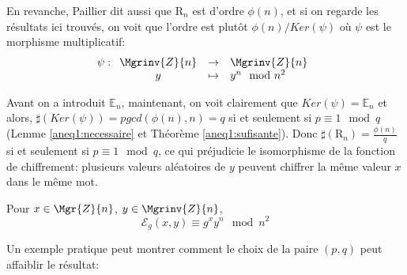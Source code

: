 		En revanche, Paillier dit aussi que $\mathrm{R}_n$ est d'ordre $\phi(n)$, et si on regarde les résultats ici trouvés, 
		on voit que l'ordre est plutôt $\phi(n)/Ker(\psi)$ où $\psi$ est le morphisme multiplicatif:
		\begin{equation}
			\psi : \begin{array}[t]{ccl} \Mgrinv{Z}{n} &\rightarrow &   \Mgrinv{Z}{n}  \\
				y&\mapsto& y^n \mod{n^2}
			 \end{array}
		\end{equation}

		
		Avant on a introduit $\mathbb{E}_n$, maintenant, on voit clairement que $Ker(\psi) = \mathbb{E}_n $ 
		et alors, $\sharp(Ker(\psi)) = pgcd(\phi(n),n) = q$ si et seulement si $p \equiv 1\mod{q}$ (Lemme \ref{aneq1:necessaire} et 
		Théorème \ref{aneq1:sufisante}). Donc $\sharp(\mathrm{R}_n) = \frac{\phi(n)}{q}$ si et seulement si $p \equiv 1 \mod{q}$,
		ce qui préjudicie le isomorphisme de la fonction de chiffrement: plusieurs valeurs aléatoires de $y$ peuvent 
		chiffrer la même valeur $x$ dans le même mot.
		\begin{rappel}
			Pour $x\in\Mgr{Z}{n}$, $y\in\Mgrinv{Z}{n}$, 
			$${\mathcal{E}}_g(x,y) \equiv g^xy^n\mod{n^2}$$
		\end{rappel}

		Un exemple pratique peut montrer comment le choix de la paire $(p,q)$ peut affaiblir le résultat:

